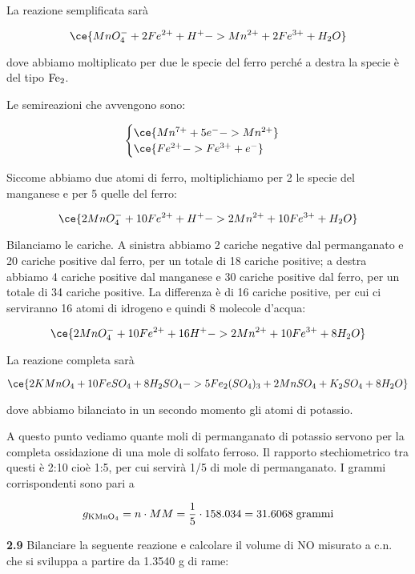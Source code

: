 La reazione semplificata sarà

$$\ce{MnO_4^- + 2Fe^{2+} + H^+ -> Mn^{2+} + 2Fe^{3+} + H_2O}$$

dove abbiamo moltiplicato per due le specie del ferro perché a destra la specie è del tipo $\rm Fe_2$.

Le semireazioni che avvengono sono:

$$\begin{cases}
    \ce{Mn^{7+} + 5e^- -> Mn^{2+}}\\
    \ce{Fe^{2+} -> Fe^{3+} + e^-}
\end{cases}$$

Siccome abbiamo due atomi di ferro, moltiplichiamo per 2 le specie del manganese e per 5 quelle del ferro:

$$\ce{2MnO_4^- + 10Fe^{2+} + H^+ -> 2Mn^{2+} + 10Fe^{3+} + H_2O}$$

Bilanciamo le cariche. A sinistra abbiamo 2 cariche negative dal permanganato e 20 cariche positive dal ferro, per un totale di 18 cariche positive; a destra abbiamo 4 cariche positive dal manganese e 30 cariche positive dal ferro, per un totale di 34 cariche positive. La differenza è di 16 cariche positive, per cui ci serviranno 16 atomi di idrogeno e quindi 8 molecole d'acqua:

$$\ce{2MnO_4^- + 10Fe^{2+} + 16H^+ -> 2Mn^{2+} + 10Fe^{3+} + 8H_2O}$$

La reazione completa sarà

$$\ce{2KMnO_4 + 10FeSO_4 + 8H_2SO_4 -> 5Fe_2(SO_4)_3 + 2MnSO_4 + K_2SO_4 + 8H_2O}$$

dove abbiamo bilanciato in un secondo momento gli atomi di potassio.

A questo punto vediamo quante moli di permanganato di potassio servono per la completa ossidazione di una mole di solfato ferroso. Il rapporto stechiometrico tra questi è 2:10 cioè 1:5, per cui servirà 1/5 di mole di permanganato. I grammi corrispondenti sono pari a

$$g_{\rm KMnO_4}=n \cdot MM=\frac{1}{5} \cdot 158.034
=31.6068 \; \rm grammi$$

\vspace{0.2cm}\textbf{2.9} Bilanciare la seguente reazione e calcolare il volume di NO misurato a c.n. che si sviluppa a
partire da 1.3540 g di rame:

\begin{center}
\end{center}

